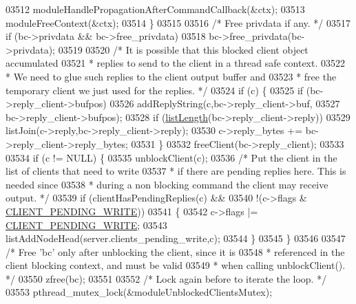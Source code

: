 \begin{DoxyCode}
{{{{{{{{{{03512             moduleHandlePropagationAfterCommandCallback(&ctx);
03513             moduleFreeContext(&ctx);
03514         \}
03515 
03516         \textcolor{comment}{/* Free privdata if any. */}
03517         \textcolor{keywordflow}{if} (bc->privdata && bc->free\_privdata)
03518             bc->free\_privdata(bc->privdata);
03519 
03520         \textcolor{comment}{/* It is possible that this blocked client object accumulated}
03521 \textcolor{comment}{         * replies to send to the client in a thread safe context.}
03522 \textcolor{comment}{         * We need to glue such replies to the client output buffer and}
03523 \textcolor{comment}{         * free the temporary client we just used for the replies. */}
03524         \textcolor{keywordflow}{if} (c) \{
03525             \textcolor{keywordflow}{if} (bc->reply\_client->bufpos)
03526                 addReplyString(c,bc->reply\_client->buf,
03527                                  bc->reply\_client->bufpos);
03528             \textcolor{keywordflow}{if} (\hyperlink{adlist_8h_afde0ab079f934670e82119b43120e94b}{listLength}(bc->reply\_client->reply))
03529                 listJoin(c->reply,bc->reply\_client->reply);
03530             c->reply\_bytes += bc->reply\_client->reply\_bytes;
03531         \}
03532         freeClient(bc->reply\_client);
03533 
03534         \textcolor{keywordflow}{if} (c != NULL) \{
03535             unblockClient(c);
03536             \textcolor{comment}{/* Put the client in the list of clients that need to write}
03537 \textcolor{comment}{             * if there are pending replies here. This is needed since}
03538 \textcolor{comment}{             * during a non blocking command the client may receive output. */}
03539             \textcolor{keywordflow}{if} (clientHasPendingReplies(c) &&
03540                 !(c->flags & \hyperlink{server_8h_addd2e991874faef411339e9ae9619023}{CLIENT\_PENDING\_WRITE}))
03541             \{
03542                 c->flags |= \hyperlink{server_8h_addd2e991874faef411339e9ae9619023}{CLIENT\_PENDING\_WRITE};
03543                 listAddNodeHead(server.clients\_pending\_write,c);
03544             \}
03545         \}
03546 
03547         \textcolor{comment}{/* Free 'bc' only after unblocking the client, since it is}
03548 \textcolor{comment}{         * referenced in the client blocking context, and must be valid}
03549 \textcolor{comment}{         * when calling unblockClient(). */}
03550         zfree(bc);
03551 
03552         \textcolor{comment}{/* Lock again before to iterate the loop. */}
03553         pthread\_mutex\_lock(&moduleUnblockedClientsMutex);
}}}}}}}}}}
\end{DoxyCode}
